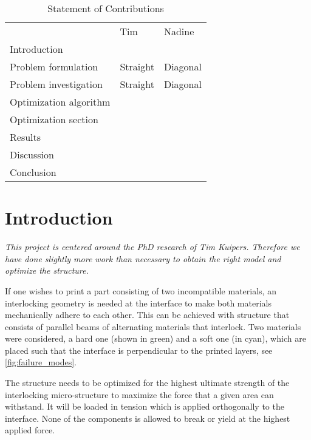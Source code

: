 \begin{table}
	\caption{Statement of Contributions}
	\begin{tabular}{lll}
		& Tim & Nadine \\
		Introduction &  \checkmark & \\
		Problem formulation & Straight & Diagonal \\
		Problem investigation & Straight & Diagonal \\
		Optimization algorithm & \checkmark & \checkmark \\
		Optimization section & \checkmark &  \\
		Results &  & \checkmark \\
		Discussion & & \checkmark \\
		Conclusion & \checkmark & \\
	\end{tabular}
\end{table}



\section{Introduction}
\textit{This project is centered around the PhD research of Tim Kuipers. 
	Therefore we have done slightly more work than necessary to obtain the right model and optimize the structure.}

\medskip

If one wishes to print a part consisting of two incompatible materials, an interlocking geometry is needed at the interface to make both materials mechanically adhere to each other. 
This can be achieved with structure that consists of parallel beams of alternating materials that interlock. 
Two materials were considered, a hard one (shown in green) and a soft one (in cyan), which are placed such that the interface is perpendicular to the printed layers, see \cref{fig:failure_modes}.

The structure needs to be optimized for the highest ultimate strength of the interlocking micro-structure to maximize the force that a given area can withstand. 
It will be loaded in tension which is applied orthogonally to the interface. 
None of the components is allowed to break or yield at the highest applied force.

